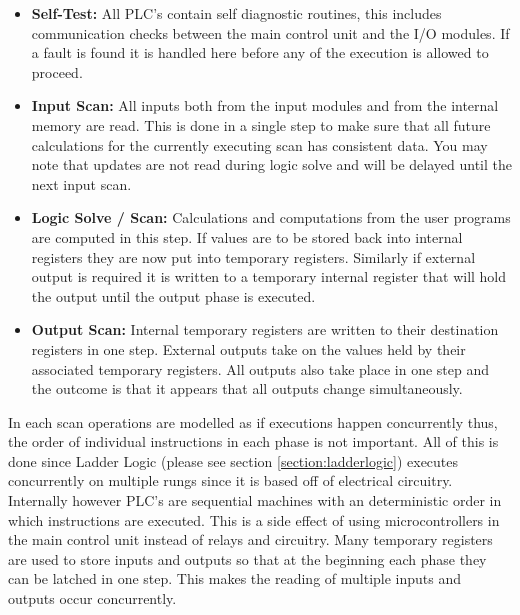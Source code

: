 \begin{itemize}
	\item\textbf{Self-Test:} All PLC's contain self diagnostic routines, this includes communication checks between the main control unit and the I/O modules. If a fault is found it is handled here before any of the execution is allowed to proceed.
	\item\textbf{Input Scan:} All inputs both from the input modules and from the internal memory are read. This is done in a single step to make sure that all future calculations for the currently executing scan has consistent data. You may note that updates are not read during logic solve and will be delayed until the next input scan.
	\item\textbf{Logic Solve / Scan:} Calculations and computations from the user programs are computed in this step. If values are to be stored back into internal registers they are now put into temporary registers. Similarly if external output is required it is written to a temporary internal register that will hold the output until the output phase is executed.
	\item\textbf{Output Scan:} Internal temporary registers are written to their destination registers in one step. External outputs take on the values held by their associated temporary registers. All outputs also take place in one step and the outcome is that it appears that all outputs change simultaneously.
\end{itemize}

In each scan operations are modelled as if executions happen concurrently thus, the order of individual instructions in each phase is not important. All of this is done since Ladder Logic (please see section \ref{section:ladderlogic}) executes concurrently on multiple rungs since it is based off of electrical circuitry. Internally however PLC's are sequential machines with an deterministic order in which instructions are executed. This is a side effect of using microcontrollers in the main control unit instead of relays and circuitry. Many temporary registers are used to store inputs and outputs so that at the beginning each phase they can be latched in one step. This makes the reading of multiple inputs and outputs occur concurrently.

